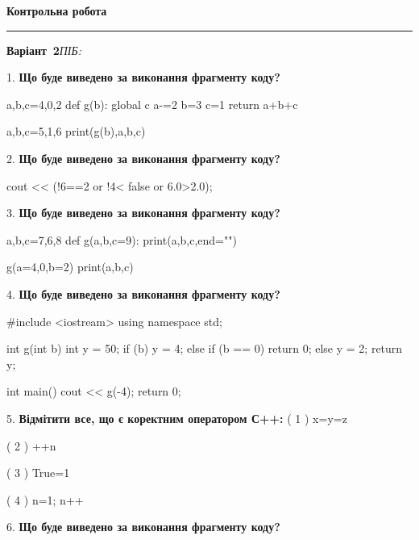 \documentclass[11pt]{article}
\begin{document}
{\centering\Large\bfseries Контрольна робота\par}
\medskip
\noindent\rule{\linewidth}{0.5pt}
\smallskip
\noindent\textbf{Варіант \No\,2}\hfill \textit{ПІБ:}\,\underline{\hspace{60mm}}
\vspace{4mm}

1. \textbf{Що буде виведено за виконання фрагменту коду?}

a,b,c=4,0,2
def g(b):
global c    a-=2
    b=3
    c=1
    return a+b+c

a,b,c=5,1,6
print(g(b),a,b,c)
\par\vspace{5mm}

2. \textbf{Що буде виведено за виконання фрагменту коду?}

cout << (!6==2 or !4< false or 6.0>2.0);
\par\vspace{5mm}

3. \textbf{Що буде виведено за виконання фрагменту коду?}

a,b,c=7,6,8
def g(a,b,c=9):
    print(a,b,c,end="")

g(a=4,0,b=2)
print(a,b,c)

\par\vspace{5mm}

4. \textbf{Що буде виведено за виконання фрагменту коду?}

#include <iostream>
using namespace std;

int g(int b){
    int y = 50;
    if (b) 
        y = 4;
    else if (b == 0)
         return 0;
    else
         y = 2;
    return y;
}

int main(){
    cout << g(-4);
    return 0;
}

\par\vspace{5mm}

5. %
\textbf{Відмітити все, що є коректним оператором С++:}
( 1 ) x=y=z

( 2 ) ++n

( 3 ) True=1

( 4 ) n=1; n++
\par\vspace{5mm}

6. \textbf{Що буде виведено за виконання фрагменту коду?}
\end{document}
